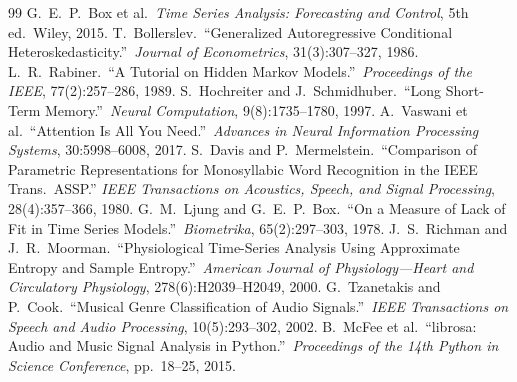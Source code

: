 \documentclass[12pt,a4paper]{article}
\begin{document}
\begin{thebibliography}{99}
 G.~E.~P.~Box et al.\ \textit{Time Series Analysis: Forecasting and Control}, 5th ed.\ Wiley, 2015.
 T.~Bollerslev.\ ``Generalized Autoregressive Conditional Heteroskedasticity.''\ \textit{Journal of Econometrics}, 31(3):307--327, 1986.
 L.~R.~Rabiner.\ ``A Tutorial on Hidden Markov Models.''\ \textit{Proceedings of the IEEE}, 77(2):257--286, 1989.
 S.~Hochreiter and J.~Schmidhuber.\ ``Long Short-Term Memory.''\ \textit{Neural Computation}, 9(8):1735--1780, 1997.
 A.~Vaswani et al.\ ``Attention Is All You Need.''\ \textit{Advances in Neural Information Processing Systems}, 30:5998--6008, 2017.
 S.~Davis and P.~Mermelstein.\ ``Comparison of Parametric Representations for Monosyllabic Word Recognition in the IEEE Trans.\ ASSP.'' \textit{IEEE Transactions on Acoustics, Speech, and Signal Processing}, 28(4):357--366, 1980.
 G.~M.~Ljung and G.~E.~P.~Box.\ ``On a Measure of Lack of Fit in Time Series Models.''\ \textit{Biometrika}, 65(2):297--303, 1978.
 J.~S.~Richman and J.~R.~Moorman.\ ``Physiological Time-Series Analysis Using Approximate Entropy and Sample Entropy.''\ \textit{American Journal of Physiology---Heart and Circulatory Physiology}, 278(6):H2039--H2049, 2000.
 G.~Tzanetakis and P.~Cook.\ ``Musical Genre Classification of Audio Signals.''\ \textit{IEEE Transactions on Speech and Audio Processing}, 10(5):293--302, 2002.
 B.~McFee et al.\ ``librosa: Audio and Music Signal Analysis in Python.''\ \textit{Proceedings of the 14th Python in Science Conference}, pp.\ 18--25, 2015.
\end{thebibliography}
\end{document}
